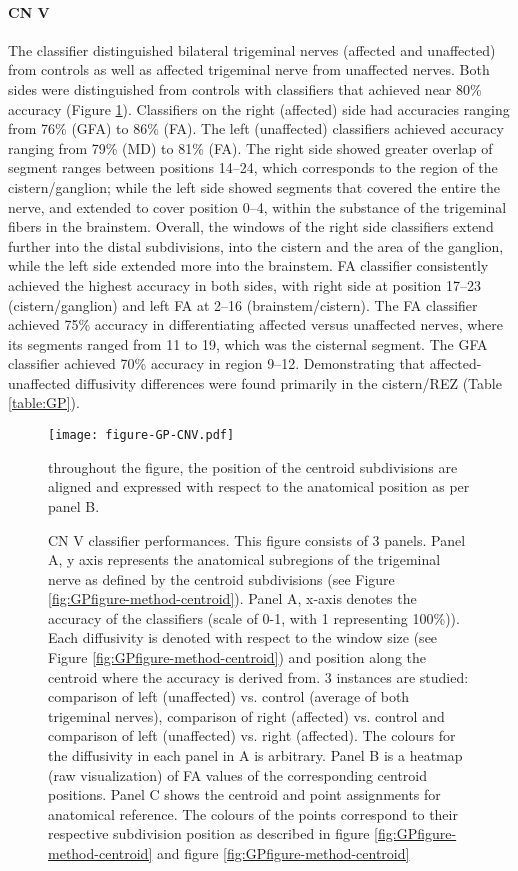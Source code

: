 \paragraph{CN V}
The classifier distinguished bilateral trigeminal nerves (affected and unaffected) from controls as well as affected trigeminal nerve from unaffected nerves. Both sides were distinguished from controls with classifiers that achieved near 80\% accuracy (Figure \ref{fig:GPfigure4}). 
Classifiers on the right (affected) side had accuracies ranging from 76\% (GFA) to 86\% (FA). The left (unaffected) classifiers achieved accuracy ranging from 79\% (MD) to 81\% (FA). The right side showed greater overlap of segment ranges between positions 14--24, which corresponds to the region of the cistern/ganglion; while the left side showed segments that covered the entire the nerve, and extended to cover position 0--4, within the substance of the trigeminal fibers in the brainstem. Overall, the windows of the right side classifiers extend further into the distal subdivisions, into the cistern and the area of the ganglion, while the left side extended more into the brainstem. FA classifier consistently achieved the highest accuracy in both sides, with right side at position 17--23 (cistern/ganglion) and left FA at 2--16 (brainstem/cistern).
The FA classifier achieved 75\% accuracy in differentiating affected versus unaffected nerves, where its segments ranged from 11 to 19, which was the cisternal segment. The GFA classifier achieved 70\% accuracy in region 9--12. Demonstrating that affected-unaffected diffusivity differences were found primarily in the cistern/REZ (Table \ref{table:GP}).

\begin{figure}[p]
\centering
\texttt{[image: figure-GP-CNV.pdf]}
\caption{CN V classifier performances. This figure consists of 3 panels. Panel A, y axis represents the anatomical subregions of the trigeminal nerve as defined by the centroid subdivisions (see Figure \ref{fig:GPfigure-method-centroid}). Panel A, x-axis denotes the accuracy of the classifiers (scale of 0-1, with 1 representing 100\%)). Each diffusivity is denoted with respect to the window size (see Figure \ref{fig:GPfigure-method-centroid}) and position along the centroid where the accuracy is derived from. 3 instances are studied: comparison of left (unaffected) vs. control (average of both trigeminal nerves), comparison of right (affected) vs. control and comparison of left (unaffected) vs. right (affected). The colours for the diffusivity in each panel in A is arbitrary. Panel B is a heatmap (raw visualization) of FA values of the corresponding centroid positions. Panel C shows the centroid and point assignments for anatomical reference. The colours of the points correspond to their respective subdivision position as described in figure \ref{fig:GPfigure-method-centroid} and figure \ref{fig:GPfigure-method-centroid}} throughout the figure, the position of the centroid subdivisions are aligned and expressed with respect to the anatomical position as per panel B.
\label{fig:GPfigure4}
\end{figure}

